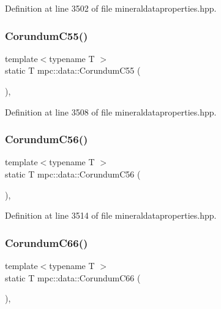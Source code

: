 Definition at line 3502 of file mineraldataproperties.\+hpp.

\mbox{\label{namespacempc_1_1data_aafb798ca906c5052bcfc8e86bf39ecad}} 
\subsubsection{\texorpdfstring{Corundum\+C55()}{CorundumC55()}}
{\footnotesize\ttfamily template$<$typename T $>$ \\
static T mpc\+::data\+::\+Corundum\+C55 (\begin{DoxyParamCaption}{ }\end{DoxyParamCaption})\hspace{0.3cm}{\ttfamily [inline]}, {\ttfamily [static]}}



Definition at line 3508 of file mineraldataproperties.\+hpp.

\mbox{\label{namespacempc_1_1data_a21181a8c6bcce00d0f4e0db508eecdd1}} 
\subsubsection{\texorpdfstring{Corundum\+C56()}{CorundumC56()}}
{\footnotesize\ttfamily template$<$typename T $>$ \\
static T mpc\+::data\+::\+Corundum\+C56 (\begin{DoxyParamCaption}{ }\end{DoxyParamCaption})\hspace{0.3cm}{\ttfamily [inline]}, {\ttfamily [static]}}



Definition at line 3514 of file mineraldataproperties.\+hpp.

\mbox{\label{namespacempc_1_1data_a29162dbfd0a5419602cd6847cc8e8d90}} 
\subsubsection{\texorpdfstring{Corundum\+C66()}{CorundumC66()}}
{\footnotesize\ttfamily template$<$typename T $>$ \\
static T mpc\+::data\+::\+Corundum\+C66 (\begin{DoxyParamCaption}{ }\end{DoxyParamCaption})\hspace{0.3cm}{\ttfamily [inline]}, {\ttfamily [static]}}



